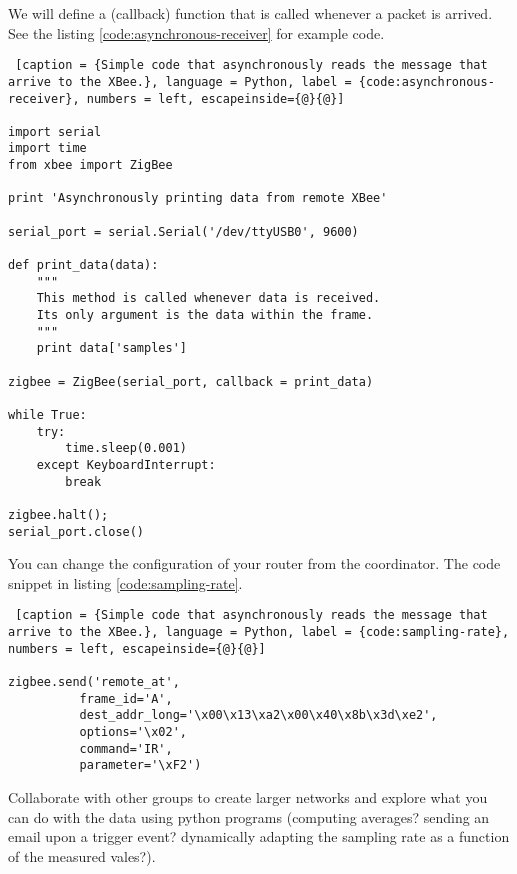 We will define a (callback) function that is called whenever a packet is arrived.
See the listing \ref{code:asynchronous-receiver} for example code.

\begin{lstlisting} [caption = {Simple code that asynchronously reads the message that arrive to the XBee.}, language = Python, label = {code:asynchronous-receiver}, numbers = left, escapeinside={@}{@}]

import serial
import time
from xbee import ZigBee

print 'Asynchronously printing data from remote XBee'

serial_port = serial.Serial('/dev/ttyUSB0', 9600)

def print_data(data):
    """
    This method is called whenever data is received.
    Its only argument is the data within the frame.
    """
    print data['samples']

zigbee = ZigBee(serial_port, callback = print_data)

while True:
    try:
        time.sleep(0.001)
    except KeyboardInterrupt:
        break

zigbee.halt();
serial_port.close()

\end{lstlisting}

You can change the configuration of your router from the coordinator. 
The code snippet in listing \ref{code:sampling-rate}.

\begin{lstlisting} [caption = {Simple code that asynchronously reads the message that arrive to the XBee.}, language = Python, label = {code:sampling-rate}, numbers = left, escapeinside={@}{@}]

zigbee.send('remote_at',
          frame_id='A',
          dest_addr_long='\x00\x13\xa2\x00\x40\x8b\x3d\xe2',
          options='\x02',
          command='IR',
          parameter='\xF2')

\end{lstlisting}

Collaborate with other groups to create larger networks and explore what you can do with the data using python programs (computing averages? sending an email upon a trigger event? dynamically adapting the sampling rate as a function of the measured vales?).


